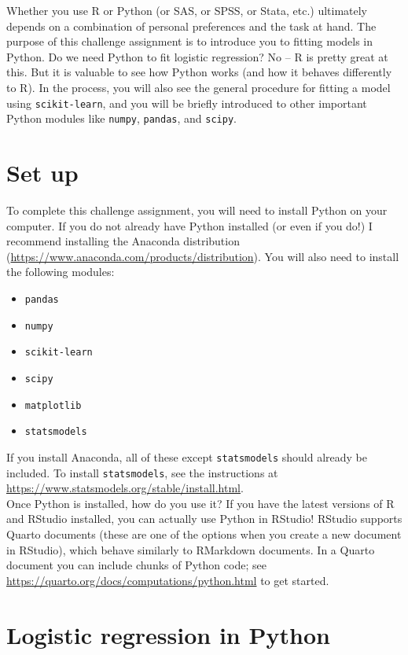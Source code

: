 \documentclass[11pt]{article}
\begin{document}
\noindent Whether you use R or Python (or SAS, or SPSS, or Stata, etc.) ultimately depends on a combination of personal preferences and the task at hand. The purpose of this challenge assignment is to introduce you to fitting models in Python. Do we need Python to fit logistic regression? No -- R is pretty great at this. But it is valuable to see how Python works (and how it behaves differently to R). In the process, you will also see the general procedure for fitting a model using \texttt{scikit-learn}, and you will be briefly introduced to other important Python modules like \texttt{numpy}, \texttt{pandas}, and \texttt{scipy}.

\section*{Set up}

To complete this challenge assignment, you will need to install Python on your computer. If you do not already have Python installed (or even if you do!) I recommend installing the Anaconda distribution (\url{https://www.anaconda.com/products/distribution}). You will also need to install the following modules:
\begin{itemize}
\item \texttt{pandas}
\item \texttt{numpy}
\item \texttt{scikit-learn}
\item \texttt{scipy}
\item \texttt{matplotlib}
\item \texttt{statsmodels}
\end{itemize}
If you install Anaconda, all of these except \texttt{statsmodels} should already be included. To install \texttt{statsmodels}, see the instructions at \url{https://www.statsmodels.org/stable/install.html}.\\

\noindent Once Python is installed, how do you use it? If you have the latest versions of R and RStudio installed, you can actually use Python in RStudio! RStudio supports Quarto documents (these are one of the options when you create a new document in RStudio), which behave similarly to RMarkdown documents. In a Quarto document you can include chunks of Python code; see \url{https://quarto.org/docs/computations/python.html} to get started.

\section*{Logistic regression in Python}
\end{document}
